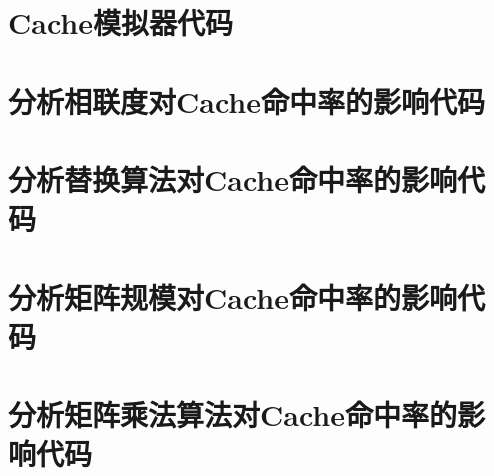 \appendix
\section{Cache模拟器代码}


\section{分析相联度对Cache命中率的影响代码}


\section{分析替换算法对Cache命中率的影响代码}


\section{分析矩阵规模对Cache命中率的影响代码}


\section{分析矩阵乘法算法对Cache命中率的影响代码}


